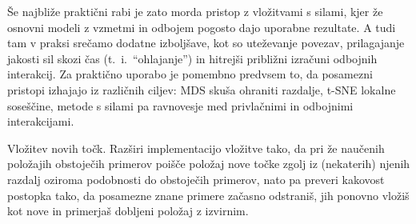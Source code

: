 Še najbliže praktični rabi je zato morda pristop z vložitvami s silami, kjer že osnovni modeli z vzmetmi in odbojem pogosto dajo uporabne rezultate. A tudi tam v praksi srečamo dodatne izboljšave, kot so uteževanje povezav, prilagajanje jakosti sil skozi čas (t.~i.\ ``ohlajanje'') in hitrejši približni izračuni odbojnih interakcij. Za praktično uporabo je pomembno predvsem to, da posamezni pristopi izhajajo iz različnih ciljev: MDS skuša ohraniti razdalje, t-SNE lokalne soseščine, metode s silami pa ravnovesje med privlačnimi in odbojnimi interakcijami.

\begin{exercise}{Vložitev novih točk.}
Razširi implementacijo vložitve tako, da pri že naučenih položajih obstoječih primerov poišče položaj nove točke zgolj iz (nekaterih) njenih razdalj oziroma podobnosti do obstoječih primerov, nato pa preveri kakovost postopka tako, da posamezne znane primere začasno odstraniš, jih ponovno vložiš kot nove in primerjaš dobljeni položaj z izvirnim.
\end{exercise}


